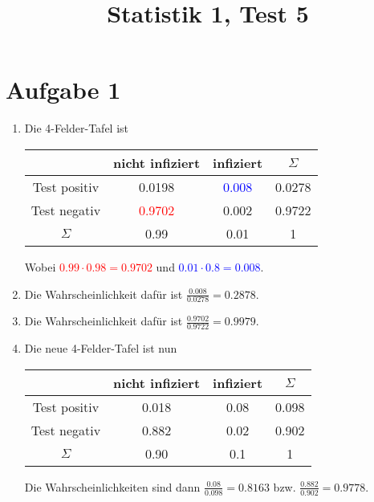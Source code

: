\documentclass{article}
\title{\textbf{Statistik 1, Test 5}}
\date{}
\begin{document}
	\maketitle
	
	\section*{Aufgabe 1}
	\begin{enumerate}[label=(\alph*)]
		\item Die 4-Felder-Tafel ist
		\begin{center}
			\begin{tabular}{c|cc|c}
				& nicht infiziert & infiziert & $\Sigma$ \\
				\hline
				Test positiv & 0.0198 & \textcolor{blue}{0.008} & 0.0278 \\
				Test negativ & \textcolor{red}{0.9702} & 0.002 & 0.9722 \\
				\hline
				$\Sigma$ & 0.99 & 0.01 & 1
			\end{tabular}
		\end{center}
		Wobei \textcolor{red}{$0.99\cdot 0.98 = 0.9702$} und \textcolor{blue}{$0.01\cdot 0.8 = 0.008$}.
		\item Die Wahrscheinlichkeit dafür ist $\frac{0.008}{0.0278}=0.2878$.
		\item Die Wahrscheinlichkeit dafür ist $\frac{0.9702}{0.9722}=0.9979$.
		\item Die neue 4-Felder-Tafel ist nun
		\begin{center}
			\begin{tabular}{c|cc|c}
				& nicht infiziert & infiziert & $\Sigma$ \\
				\hline
				Test positiv & 0.018  & 0.08  & 0.098  \\
				Test negativ & 0.882  & 0.02 & 0.902  \\
				\hline
				$\Sigma$ & 0.90 & 0.1 & 1
			\end{tabular}
		\end{center}
		Die Wahrscheinlichkeiten sind dann $\frac{0.08}{0.098}=0.8163$ bzw. $\frac{0.882}{0.902}=0.9778$.
	\end{enumerate}
\end{document}
